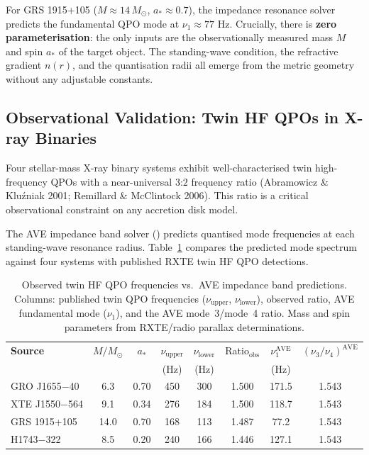 For GRS 1915+105 ($M \approx 14\,M_\odot$, $a_* \approx 0.7$), the impedance resonance solver predicts the fundamental QPO mode at $\nu_1 \approx 77$ Hz. Crucially, there is \textbf{zero parameterisation}: the only inputs are the observationally measured mass $M$ and spin $a_*$ of the target object. The standing-wave condition, the refractive gradient $n(r)$, and the quantisation radii all emerge from the metric geometry without any adjustable constants.

\subsection{Observational Validation: Twin HF QPOs in X-ray Binaries}
\label{sec:qpo_validation}

Four stellar-mass X-ray binary systems exhibit well-characterised twin high-frequency QPOs with a near-universal $3$:$2$ frequency ratio (Abramowicz \& Klu{\'z}niak 2001; Remillard \& McClintock 2006). This ratio is a critical observational constraint on any accretion disk model.

The AVE impedance band solver ({}) predicts quantised mode frequencies at each standing-wave resonance radius. Table~\ref{tab:qpo_comparison} compares the predicted mode spectrum against four systems with published RXTE twin HF QPO detections.

\begin{table}[H]
\centering
\caption{Observed twin HF QPO frequencies vs.\ AVE impedance band predictions. Columns: published twin QPO frequencies ($\nu_{\text{upper}}$, $\nu_{\text{lower}}$), observed ratio, AVE fundamental mode ($\nu_1$), and the AVE mode~3/mode~4 ratio. Mass and spin parameters from RXTE/radio parallax determinations.}
\label{tab:qpo_comparison}
\small
\begin{tabularx}{\textwidth}{@{}l c c c c c c c@{}}
\toprule
\textbf{Source} & $M/M_\odot$ & $a_*$ & $\nu_{\text{upper}}$ & $\nu_{\text{lower}}$ & Ratio$_{\text{obs}}$ & $\nu_1^{\text{AVE}}$ & $(\nu_3/\nu_4)^{\text{AVE}}$ \\
 & & & (Hz) & (Hz) & & (Hz) & \\
\midrule
GRO J1655$-$40 & 6.3  & 0.70 & 450  & 300  & 1.500 & 171.5 & 1.543 \\
XTE J1550$-$564 & 9.1  & 0.34 & 276  & 184  & 1.500 & 118.7 & 1.543 \\
GRS 1915+105    & 14.0 & 0.70 & 168  & 113  & 1.487 & 77.2  & 1.543 \\
H1743$-$322     & 8.5  & 0.20 & 240  & 166  & 1.446 & 127.1 & 1.543 \\
\bottomrule
\end{tabularx}
\end{table}

